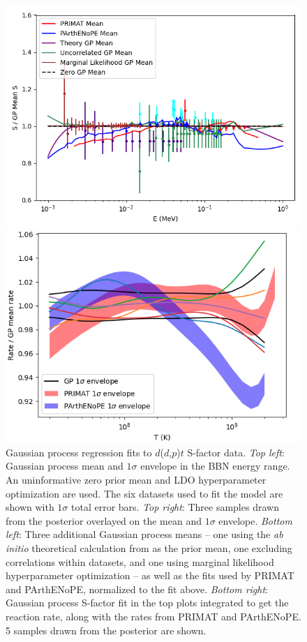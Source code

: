 \documentclass[%
 reprint,
superscriptaddress,
nofootinbib,
 amsmath,amssymb,
 aps,
 pra,
]{revtex4-2}
\begin{document}
\begin{figure}
\begin{minipage}{.48\textwidth}
		\includegraphics[width=\linewidth]{Figures/ddtp_S_comp.png}	
	\end{minipage}
	\hspace{0mm}
	\begin{minipage}{.48\textwidth}
    		\centering
		\includegraphics[width=\linewidth]{Figures/ddtp_rate.png}	
	\end{minipage}
    	\caption{Gaussian process regression fits to $d$($d$,$p$)$t$ S-factor data. \textit{Top left}: Gaussian process mean and $1\sigma$ envelope in the BBN energy range. An uninformative zero prior mean and LDO hyperparameter optimization are used. The six datasets \cite{Krauss1987, Brown1990, Greife1995, Leonard2006} used to fit the model are shown with $1\sigma$ total error bars. \textit{Top right}: Three samples drawn from the posterior overlayed on the mean and $1\sigma$ envelope. \textit{Bottom left}: Three additional Gaussian process means -- one using the \textit{ab initio} theoretical calculation from \cite{Arai2011} as the prior mean, one excluding correlations within datasets, and one using marginal likelihood hyperparameter optimization -- as well as the fits used by PRIMAT and PArthENoPE, normalized to the fit above. \textit{Bottom right}: Gaussian process S-factor fit in the top plots integrated to get the reaction rate, along with the rates from PRIMAT and PArthENoPE. 5 samples drawn from the posterior are shown. }
\end{figure}
\end{document}
